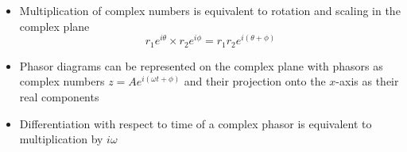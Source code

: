\documentclass{article}
\begin{document}
\begin{itemize}
  \item Multiplication of complex numbers is equivalent to rotation and scaling in the complex plane \[r_1 e^{i \theta} \times r_2 e^{i \phi} = r_1 r_2 e^{i (\theta + \phi)}\]

  \item Phasor diagrams can be represented on the complex plane with phasors as complex numbers $z = A e^{i (\omega t + \phi)}$ and their projection onto the $x$-axis as their real components

  \item Differentiation with respect to time of a complex phasor is equivalent to multiplication by $i \omega$
\end{itemize}
\end{document}
